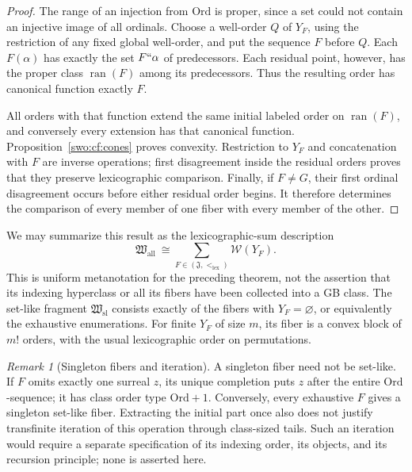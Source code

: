 \documentclass[11pt]{article}
\theoremstyle{definition}
\theoremstyle{remark}
\newtheorem{remark}[remark]{Remark}
\newcommand{\Ord}{\mathrm{Ord}}
\newcommand{\WO}{\mathcal W}
\newcommand{\Hsl}{\mathfrak W_{\mathrm{sl}}}
\newcommand{\Hall}{\mathfrak W_{\mathrm{all}}}
\newcommand{\Jinj}{\mathfrak J}
\newcommand{\lex}{\mathrm{lex}}
\begin{document}
\begin{proof}
The range of an injection from \(\Ord\) is proper, since a set could
not contain an injective image of all ordinals.  Choose a well-order \(Q\)
of \(Y_F\), using the restriction of any fixed global well-order, and
put the sequence \(F\) before \(Q\).  Each \(F(\alpha)\) has exactly
the set \(F``\alpha\) of predecessors.  Each residual point, however,
has the proper class \(\operatorname{ran}(F)\) among its predecessors.
Thus the resulting order has canonical function exactly \(F\).

All orders with that function extend the same initial labeled order on
\(\operatorname{ran}(F)\), and conversely every extension has that
canonical function.  Proposition~\ref{swo:cf:cones} proves convexity.
Restriction to \(Y_F\) and concatenation with \(F\) are inverse
operations; first disagreement inside the residual orders proves that they
preserve lexicographic comparison.  Finally, if \(F\ne G\), their first
ordinal disagreement occurs before either residual order begins.  It
therefore determines the comparison of every member of one fiber with
every member of the other.
\end{proof}

We may summarize this result as the lexicographic-sum description
\[
 \Hall\ \cong
 \sum_{F\in(\Jinj,<_{\lex})}\WO(Y_F).
\]
This is uniform metanotation for the preceding theorem, not the assertion
that its indexing hyperclass or all its fibers have been collected into a
GB class.  The set-like fragment \(\Hsl\) consists exactly of the fibers
with \(Y_F=\varnothing\), or equivalently the exhaustive enumerations.
For finite \(Y_F\) of size \(m\), its fiber is a convex block of
\(m!\) orders, with the usual lexicographic order on permutations.

\begin{remark}[Singleton fibers and iteration]
\label{swo:cf:singleton}
A singleton fiber need not be set-like.  If \(F\) omits exactly one
surreal \(z\), its unique completion puts \(z\) after the entire
\(\Ord\)-sequence; it has class order type \(\Ord+1\).  Conversely,
every exhaustive \(F\) gives a singleton set-like fiber.  Extracting the
initial part once also does not justify transfinite iteration of this
operation through class-sized tails.  Such an iteration would require a
separate specification of its indexing order, its objects, and its
recursion principle; none is asserted here.
\end{remark}

\end{document}
